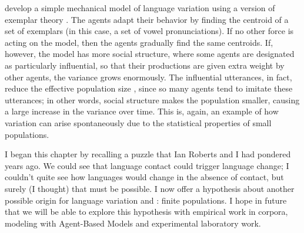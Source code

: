 \documentclass[output=paper]{langsci/langscibook}
\begin{document}
\citet{clark-kimbrough:2015} develop a simple mechanical model of
language variation using a version of exemplar theory
\citep{murphy:2002}. The agents adapt their behavior by finding the
centroid of a set of exemplars (in this case, a set of vowel
pronunciations).  If no other force is acting on the model, then the
agents gradually find the same centroids.  If, however, the model has
more social structure, where some agents are designated as
particularly influential, so that their productions are given extra
weight by other agents, the variance grows enormously. The influential
utterances, in fact, reduce the effective population size
\citep{crow-kimura:1970}, since so many agents tend to imitate these
utterances; in other words, social structure makes the population
smaller, causing a large increase in the variance over time.  This is,
again, an example of how variation can arise spontaneously due to the
statistical properties of small populations.

I began this chapter by recalling a puzzle that Ian Roberts and I had
pondered years ago.  We could see that language contact could trigger
language change; I couldn't quite see how languages would change in
the absence of contact, but surely (I thought) that must be possible.
I now offer a hypothesis about another possible origin for language
variation and : finite populations. I hope in future
that we will be able to explore this hypothesis with empirical work in
corpora, modeling with Agent-Based Models and experimental laboratory
work.

{\sloppy
\printbibliography[heading=subbibliography,notkeyword=this]
}
\end{document}
